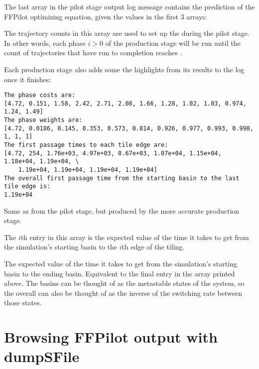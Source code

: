 {The last array in the pilot stage output log message contains the prediction of the FFPilot optimizing equation, given the values in the first 3 arrays:
\begin{description}[style=nextline]
    \item[optimized trajectory counts]
    The trajectory counts in this array are used to set up the  during the pilot stage. In other words, each phase $i>0$ of the production stage will be run until the count of trajectories that have run to completion reaches .
\end{description}

Each production stage also adds some the highlights from its results to the log once it finishes:
\begin{verbatim}
The phase costs are:
[4.72, 0.151, 1.58, 2.42, 2.71, 2.08, 1.66, 1.28, 1.02, 1.03, 0.974, 1.24, 1.49]
The phase weights are:
[4.72, 0.0186, 0.145, 0.353, 0.573, 0.814, 0.926, 0.977, 0.993, 0.998, 1, 1, 1]
The first passage times to each tile edge are:
[4.72, 254, 1.76e+03, 4.97e+03, 8.67e+03, 1.07e+04, 1.15e+04, 1.18e+04, 1.19e+04, \
    1.19e+04, 1.19e+04, 1.19e+04, 1.19e+04]
The overall first passage time from the starting basin to the last tile edge is:
1.19e+04
\end{verbatim}

\begin{description}[style=nextline]
    \item[phase costs and weights]
    Same as from the pilot stage, but produced by the more accurate production stage.
    \item[mean first passage times] The $i$th entry in this array is the expected value of the time it takes to get from the simulation's starting basin to the $i$th edge of the tiling.
    \item[overall mean first passage time] The expected value of the time it takes to get from the simulation's starting basin to the ending basin. Equivalent to the final entry in the  array printed above. The basins can be thought of as the metastable states of the system, so the overall  can also be thought of as the inverse of the switching rate between those states.
\end{description}

\section{Browsing FFPilot output with dumpSFile}

}
